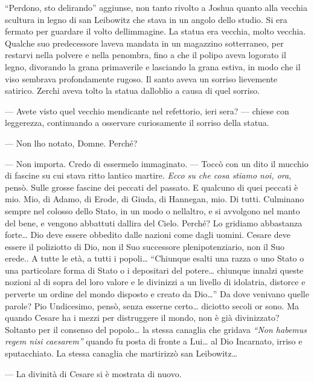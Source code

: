 ``Perdono, sto delirando'' aggiunse, non tanto rivolto a Joshua quanto
alla vecchia scultura in legno di san Leibowitz che stava in un angolo
dello studio. Si era fermato per guardare il volto
dell\textquotesingle immagine. La statua era vecchia, molto vecchia.
Qualche suo predecessore l\textquotesingle aveva mandata in un magazzino
sotterraneo, per restarvi nella polvere e nella penombra, fino a che il
polipo aveva logorato il legno, divorando la grana primaverile e
lasciando la grana estiva, in modo che il viso sembrava profondamente
rugoso. Il santo aveva un sorriso lievemente satirico. Zerchi aveva
tolto la statua dall\textquotesingle oblio a causa di quel sorriso.

--- Avete visto quel vecchio mendicante nel refettorio, ieri sera? ---
chiese con leggerezza, continuando a osservare curiosamente il sorriso
della statua.

--- Non l\textquotesingle ho notato, Domne. Perché?

--- Non importa. Credo di essermelo immaginato. --- Toccò con un dito il
mucchio di fascine su cui stava ritto l\textquotesingle antico martire.
\emph{Ecco su che cosa stiamo noi, ora}, pensò. Sulle grosse fascine dei
peccati del passato. E qualcuno di quei peccati è mio. Mio, di Adamo, di
Erode, di Giuda, di Hannegan, mio. Di tutti. Culminano sempre nel
colosso dello Stato, in un modo o nell\textquotesingle altro, e si
avvolgono nel manto del bene, e vengono abbattuti
dall\textquotesingle ira del Cielo. Perché? Lo gridiamo abbastanza
forte\ldots{} Dio deve essere obbedito dalle nazioni come dagli uomini.
Cesare deve essere il poliziotto di Dio, non il Suo successore
plenipotenziario, non il Suo erede.. A tutte le età, a tutti i
popoli\ldots{} ``Chiunque esalti una razza o uno Stato o una particolare
forma di Stato o i depositari del potere\ldots{} chiunque innalzi queste
nozioni al di sopra del loro valore e le divinizzi a un livello di
idolatria, distorce e perverte un ordine del mondo disposto e creato da
Dio\ldots'' Da dove venivano quelle parole? Pio Undicesimo, pensò, senza
esserne certo\ldots{} diciotto secoli or sono. Ma quando Cesare ha i
mezzi per distruggere il mondo, non è già divinizzato? Soltanto per il
consenso del popolo\ldots{} la stessa canaglia che gridava \emph{``Non
	habemus regem nisi caesarem''} quando fu posta di fronte a Lui\ldots{}
al Dio Incarnato, irriso e sputacchiato. La stessa canaglia che
martirizzò san Leibowitz\ldots{}

--- La divinità di Cesare si è mostrata di nuovo.

